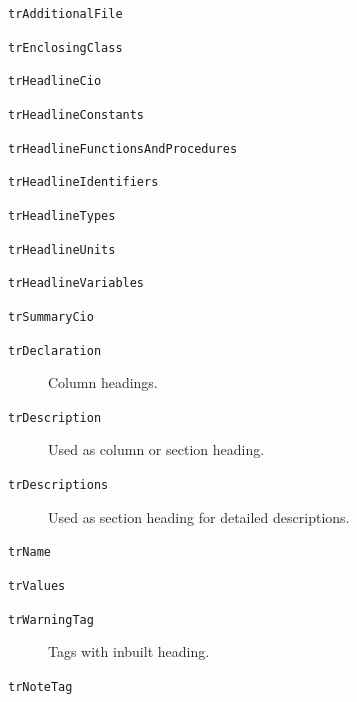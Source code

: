 \documentclass{report}
\begin{document}
\begin{list}{}
\begin{description}
\item[\texttt{trAdditionalFile}] \label{PasDoc_Languages-trAdditionalFile}
\index{}
 
\item[\texttt{trEnclosingClass}] \label{PasDoc_Languages-trEnclosingClass}
\index{}
 
\item[\texttt{trHeadlineCio}] \label{PasDoc_Languages-trHeadlineCio}
\index{}
 
\item[\texttt{trHeadlineConstants}] \label{PasDoc_Languages-trHeadlineConstants}
\index{}
 
\item[\texttt{trHeadlineFunctionsAndProcedures}] \label{PasDoc_Languages-trHeadlineFunctionsAndProcedures}
\index{}
 
\item[\texttt{trHeadlineIdentifiers}] \label{PasDoc_Languages-trHeadlineIdentifiers}
\index{}
 
\item[\texttt{trHeadlineTypes}] \label{PasDoc_Languages-trHeadlineTypes}
\index{}
 
\item[\texttt{trHeadlineUnits}] \label{PasDoc_Languages-trHeadlineUnits}
\index{}
 
\item[\texttt{trHeadlineVariables}] \label{PasDoc_Languages-trHeadlineVariables}
\index{}
 
\item[\texttt{trSummaryCio}] \label{PasDoc_Languages-trSummaryCio}
\index{}
 
\item[\texttt{trDeclaration}] \label{PasDoc_Languages-trDeclaration}
\index{}
Column headings.
\item[\texttt{trDescription}] \label{PasDoc_Languages-trDescription}
\index{}
Used as column or section heading.
\item[\texttt{trDescriptions}] \label{PasDoc_Languages-trDescriptions}
\index{}
Used as section heading for detailed descriptions.
\item[\texttt{trName}] \label{PasDoc_Languages-trName}
\index{}
 
\item[\texttt{trValues}] \label{PasDoc_Languages-trValues}
\index{}
 
\item[\texttt{trWarningTag}] \label{PasDoc_Languages-trWarningTag}
\index{}
Tags with inbuilt heading.
\item[\texttt{trNoteTag}] \label{PasDoc_Languages-trNoteTag}
\index{}
 

\end{description}
\end{list}
\end{document}
